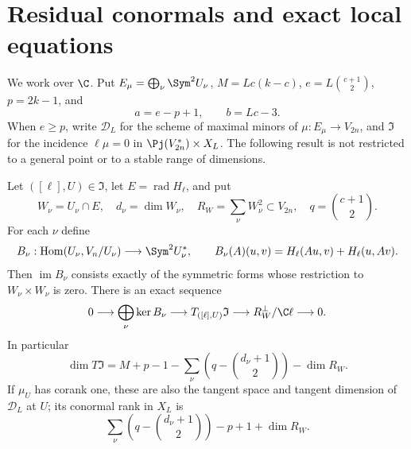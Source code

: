 \section{Residual conormals and exact local equations}\label{sec:residual-calculus}
We work over $\C$. Put $E_\mu=\bigoplus_\nu\Sym^2U_\nu$,
$M=Lc(k-c)$, $e=L\binom{c+1}{2}$, $p=2k-1$, and
\[
 a=e-p+1,\qquad b=Lc-3.
\]
When $e\ge p$, write $\mathscr D_L$ for the scheme of maximal minors of
$\mu:E_\mu\longrightarrow V_{2n}$, and $\mathfrak I$ for the incidence
$\ell\mu=0$ in $\Pj(V_{2n}^*)\times X_L$.
The following result is not restricted to a general point or to a stable
range of dimensions.

\begin{theorem}\label{thm:residual-tangent}
Let $([\ell],U)\in\mathfrak I$, let $E=\operatorname{rad}H_\ell$, and put
\[
 W_\nu=U_\nu\cap E,\quad d_\nu=\dim W_\nu,\quad
 R_W=\sum_\nu W_\nu^2\subset V_{2n},\quad
 q=\binom{c+1}{2}.
\]
For each $\nu$ define
\[
 B_\nu:\operatorname{Hom}(U_\nu,V_n/U_\nu)\longrightarrow\Sym^2U_\nu^*,
 \qquad B_\nu(A)(u,v)=H_\ell(Au,v)+H_\ell(u,Av).
\]
Then $\operatorname{im}B_\nu$ consists exactly of the symmetric forms
whose restriction to $W_\nu\times W_\nu$ is zero. There is an exact sequence
\begin{equation}\label{eq:residual-tangent-sequence}
 0\longrightarrow\bigoplus_\nu\ker B_\nu
 \longrightarrow T_{([\ell],U)}\mathfrak I
 \longrightarrow R_W^\perp/\C\ell\longrightarrow0.
\end{equation}
In particular
\begin{equation}\label{eq:residual-tangent-dimension}
 \dim T\mathfrak I
 =M+p-1-\sum_\nu\left(q-\binom{d_\nu+1}{2}\right)-\dim R_W.
\end{equation}
If $\mu_U$ has corank one, these are also the tangent space and tangent
dimension of $\mathscr D_L$ at $U$; its conormal rank in $X_L$ is
\begin{equation}\label{eq:residual-conormal-rank}
 \sum_\nu\left(q-\binom{d_\nu+1}{2}\right)-p+1+\dim R_W.
\end{equation}
\end{theorem}
